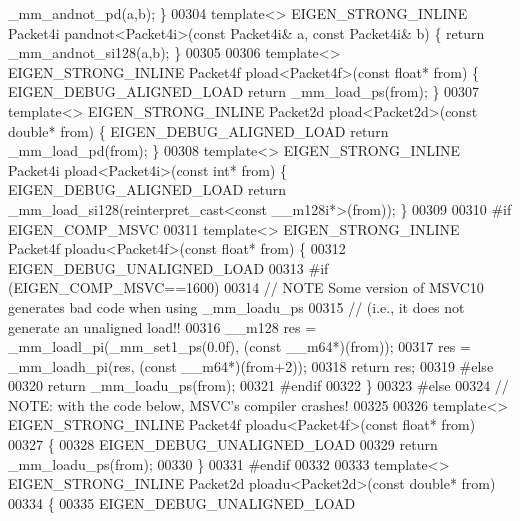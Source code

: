 \begin{DoxyCode}
      \_mm\_andnot\_pd(a,b); \}
00304 \textcolor{keyword}{template}<> EIGEN\_STRONG\_INLINE Packet4i pandnot<Packet4i>(\textcolor{keyword}{const} Packet4i& a, \textcolor{keyword}{const} Packet4i& b) \{ \textcolor{keywordflow}{return} 
      \_mm\_andnot\_si128(a,b); \}
00305 
00306 \textcolor{keyword}{template}<> EIGEN\_STRONG\_INLINE Packet4f pload<Packet4f>(\textcolor{keyword}{const} \textcolor{keywordtype}{float}*   from) \{ EIGEN\_DEBUG\_ALIGNED\_LOAD \textcolor{keywordflow}{
      return} \_mm\_load\_ps(from); \}
00307 \textcolor{keyword}{template}<> EIGEN\_STRONG\_INLINE Packet2d pload<Packet2d>(\textcolor{keyword}{const} \textcolor{keywordtype}{double}*  from) \{ EIGEN\_DEBUG\_ALIGNED\_LOAD \textcolor{keywordflow}{
      return} \_mm\_load\_pd(from); \}
00308 \textcolor{keyword}{template}<> EIGEN\_STRONG\_INLINE Packet4i pload<Packet4i>(\textcolor{keyword}{const} \textcolor{keywordtype}{int}*     from) \{ EIGEN\_DEBUG\_ALIGNED\_LOAD \textcolor{keywordflow}{
      return} \_mm\_load\_si128(reinterpret\_cast<const \_\_m128i*>(from)); \}
00309 
00310 \textcolor{preprocessor}{#if EIGEN\_COMP\_MSVC}
00311   \textcolor{keyword}{template}<> EIGEN\_STRONG\_INLINE Packet4f ploadu<Packet4f>(\textcolor{keyword}{const} \textcolor{keywordtype}{float}*  from) \{
00312     EIGEN\_DEBUG\_UNALIGNED\_LOAD
00313 \textcolor{preprocessor}{    #if (EIGEN\_COMP\_MSVC==1600)}
00314     \textcolor{comment}{// NOTE Some version of MSVC10 generates bad code when using \_mm\_loadu\_ps}
00315     \textcolor{comment}{// (i.e., it does not generate an unaligned load!!}
00316     \_\_m128 res = \_mm\_loadl\_pi(\_mm\_set1\_ps(0.0f), (\textcolor{keyword}{const} \_\_m64*)(from));
00317     res = \_mm\_loadh\_pi(res, (\textcolor{keyword}{const} \_\_m64*)(from+2));
00318     \textcolor{keywordflow}{return} res;
00319 \textcolor{preprocessor}{    #else}
00320     \textcolor{keywordflow}{return} \_mm\_loadu\_ps(from);
00321 \textcolor{preprocessor}{    #endif}
00322   \}
00323 \textcolor{preprocessor}{#else}
00324 \textcolor{comment}{// NOTE: with the code below, MSVC's compiler crashes!}
00325 
00326 \textcolor{keyword}{template}<> EIGEN\_STRONG\_INLINE Packet4f ploadu<Packet4f>(\textcolor{keyword}{const} \textcolor{keywordtype}{float}* from)
00327 \{
00328   EIGEN\_DEBUG\_UNALIGNED\_LOAD
00329   \textcolor{keywordflow}{return} \_mm\_loadu\_ps(from);
00330 \}
00331 \textcolor{preprocessor}{#endif}
00332 
00333 \textcolor{keyword}{template}<> EIGEN\_STRONG\_INLINE Packet2d ploadu<Packet2d>(\textcolor{keyword}{const} \textcolor{keywordtype}{double}* from)
00334 \{
00335   EIGEN\_DEBUG\_UNALIGNED\_LOAD

\end{DoxyCode}
